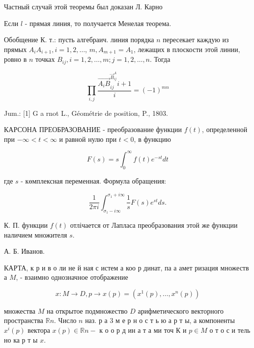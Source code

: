 \documentclass[10pt]{article}
\begin{document}
Частный случай этой теоремы был доказан Л. Карно



Если $l$ - прямая линия, то получается Менелая теорема.



Обобщение К. т.: пусть алгебраич. линия порядка $n$ пересекает каждую из прямых $A_{i} A_{i+1}, i=1,2, \ldots$, $m, A_{m+1}=A_{1}$, лежащих в плоскости этой линии, ровно в $n$ точках $B_{i j}, i=1,2, \ldots, m ; j=1,2, \ldots, n$. Тогда



\[

\prod_{i, j} \frac{{\overrightarrow{A_{i} B}}_{i j}^{\vec{B}_{i j}^{A}} i+1}{i}=(-1)^{m n}

\]



Jum.: [1] G a rnot L., Géométrie de position, P., 1803.



КАРСОНА ПРЕОБРАЗОВАНИЕ - преобразование функции $f(t)$, определенной при $-\infty<t<\infty$ и равной нулю при $t<0$, в функцию



\[

F(s)=s \int_{0}^{\infty} f(t) e^{-s t} d t

\]



где $s$ - көмплексная переменная. Формула обращения:



\[

\frac{1}{2 \pi i} \int_{\sigma_{1}-i \infty}^{\sigma_{1}+i \infty} \frac{1}{s} F(s) e^{s t} d s .

\]



К. П. функции $f(t)$ отлічается от Лапласа преобразования этой же функции наличием множителя $s$.



А. Б. Иванов.



КАРТА, к р и в о ли не й ная с истем а коо р динат, па а амет ризация множеств а $M$, - взаимно однозначное отображение



\[

x: M \longrightarrow D, p \longrightarrow x(p)=\left(x^{1}(p), \ldots, x^{n}(p)\right)

\]



множества $M$ на открытое подмножество $D$ арифметического векторного пространства $\mathbb{R} n$. Число $n$ наз. р а 3 м е р н о с т ь ю а р т ы, а компоненты $x^{i}(p)$ вектора $x(p) \in \mathbb{R} n-$ к о о р д ин а т а ми точ К и $p \in M$ о т о с и тель но ка р т ы $x$.
\end{document}
